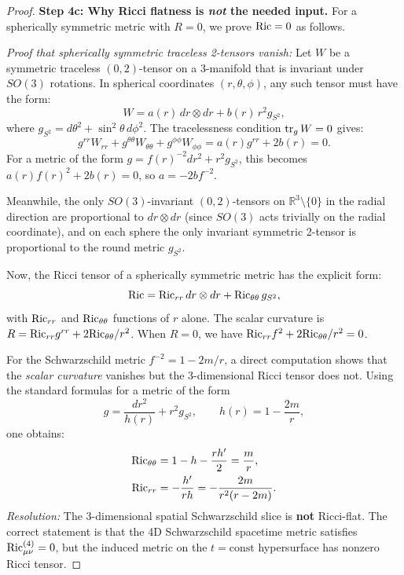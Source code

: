\begin{proof}
\textbf{Step 4c: Why Ricci flatness is \emph{not} the needed input.}
For a spherically symmetric metric with $R = 0$, we prove $\mathrm{Ric} = 0$ as follows.

\textit{Proof that spherically symmetric traceless 2-tensors vanish:}
Let $W$ be a symmetric traceless $(0,2)$-tensor on a 3-manifold that is invariant under $SO(3)$ rotations. In spherical coordinates $(r, \theta, \phi)$, any such tensor must have the form:
\begin{equation}
    W = a(r) \, dr \otimes dr + b(r) \, r^2 g_{S^2},
\end{equation}
where $g_{S^2} = d\theta^2 + \sin^2\theta \, d\phi^2$. The tracelessness condition $\operatorname{tr}_g W = 0$ gives:
\begin{equation}
    g^{rr} W_{rr} + g^{\theta\theta} W_{\theta\theta} + g^{\phi\phi} W_{\phi\phi} = a(r) g^{rr} + 2b(r) = 0.
\end{equation}
For a metric of the form $g = f(r)^{-2} dr^2 + r^2 g_{S^2}$, this becomes $a(r) f(r)^2 + 2b(r) = 0$, so $a = -2b f^{-2}$.

Meanwhile, the only $SO(3)$-invariant $(0,2)$-tensors on $\mathbb{R}^3 \setminus \{0\}$ in the radial direction are proportional to $dr \otimes dr$ (since $SO(3)$ acts trivially on the radial coordinate), and on each sphere the only invariant symmetric 2-tensor is proportional to the round metric $g_{S^2}$. 

Now, the Ricci tensor of a spherically symmetric metric has the explicit form:
\begin{equation}
    \mathrm{Ric} = \mathrm{Ric}_{rr} \, dr \otimes dr + \mathrm{Ric}_{\theta\theta} \, g_{S^2},
\end{equation}
with $\mathrm{Ric}_{rr}$ and $\mathrm{Ric}_{\theta\theta}$ functions of $r$ alone. The scalar curvature is $R = \mathrm{Ric}_{rr} g^{rr} + 2\mathrm{Ric}_{\theta\theta}/r^2$. When $R = 0$, we have $\mathrm{Ric}_{rr} f^2 + 2\mathrm{Ric}_{\theta\theta}/r^2 = 0$.

For the Schwarzschild metric $f^{-2} = 1 - 2m/r$, a direct computation shows that the \emph{scalar curvature} vanishes but the 3-dimensional Ricci tensor does not. Using the standard formulas for a metric of the form
\[
g = \frac{dr^2}{h(r)} + r^2 g_{S^2}, \qquad h(r)=1-\frac{2m}{r},
\]
one obtains:
\begin{align}
    \mathrm{Ric}_{\theta\theta} &= 1 - h - \frac{rh'}{2} = \frac{m}{r}, \\
    \mathrm{Ric}_{rr} &= -\frac{h'}{rh} = -\frac{2m}{r^2(r-2m)}.
\end{align}
\textit{Resolution:} The 3-dimensional spatial Schwarzschild slice is \textbf{not} Ricci-flat. The correct statement is that the 4D Schwarzschild spacetime metric satisfies $\mathrm{Ric}^{(4)}_{\mu\nu} = 0$, but the induced metric on the $t = \text{const}$ hypersurface has nonzero Ricci tensor.


\end{proof}
